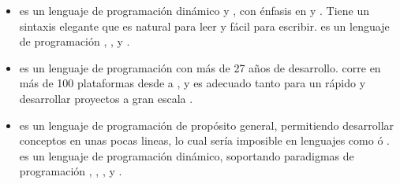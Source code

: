 \begin{itemize}
			\item
				\textbf{\rubyNAME} es un lenguaje de programación dinámico y \openSourcePC, con énfasis en \simplicity y \productivity. Tiene un sintaxis elegante que es natural para leer y fácil para escribir. \rubyNAME es un lenguaje de programación \objectOrientedPL, \imperativePL, y \functionalPL \cite{online_ruby_org}.

			\item
				\textbf{\perlNAME} es un lenguaje de programación con más de 27 años de desarrollo.  corre en más de 100 plataformas desde \portablesAS a \mainframesAS, y es adecuado tanto para un rápido \prototypingCPT y desarrollar proyectos a gran escala \cite{online_org_perl_about}.

			\item
				\textbf{\pythonNAME} es un lenguaje de programación \highLevelCPT de propósito general, permitiendo desarrollar conceptos en unas pocas lineas, lo cual sería imposible en lenguajes como \javaNAME ó \cPlusPlus. \pythonNAME es un lenguaje de programación \multiParadigmPL dinámico, soportando paradigmas de programación \objectOrientedPL, \imperativePL, \functionalPL, \proceduralPL y  \cite{online_org_docs_python_functional}.
		\end{itemize}

